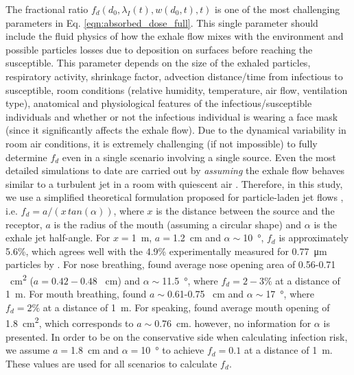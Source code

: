\documentclass[preprint]{elsarticle}
\begin{document}
The fractional ratio $f_d\left(d_0, \lambda_{I}(t), w(d_0, t), t\right)$ is one of the most challenging parameters in Eq. \ref{eqn:absorbed_dose_full}. This single parameter should include the fluid physics of how the exhale flow mixes with the environment and possible particles losses due to deposition on surfaces before reaching the susceptible. This parameter depends on the size of the exhaled particles, respiratory activity, shrinkage factor, advection distance/time from infectious to susceptible, room conditions (relative humidity, temperature, air flow, ventilation type), anatomical and physiological features of the infectious/susceptible individuals and whether or not the infectious individual is wearing a face mask (since it significantly affects the exhale flow). Due to the dynamical variability in room air conditions, it is extremely challenging (if not impossible) to fully determine $f_d$ even in a single scenario involving a single source. Even the most detailed simulations to date are carried out by \emph{assuming} the exhale flow behaves similar to a turbulent jet in a room with quiescent air \cite[e.g. see][and reference therein]{Chong_2021, Wang2021}. Therefore, in this study, we use a simplified theoretical formulation proposed for particle-laden jet flows \cite{Yang2020}, i.e. $f_d = a/(x\, tan(\alpha))$,  where $x$ is the distance between the source and the receptor, $a$ is the radius of the mouth (assuming a circular shape) and $\alpha$ is the exhale jet half-angle. For $x=$\SI{1}{\meter}, $a=$\SI{1.2}{\centi\meter} and $\alpha\sim$\SI{10}{\degree}, $f_d$ is approximately 5.6\%, which agrees well with the 4.9\% experimentally measured for \SI{0.77}{\micro\meter} particles by \cite{Liu2014}. For nose breathing, \citep{Gupta_2010} found average nose opening area of 0.56-0.71 \SI{}{\square\centi\meter} ($a=0.42-0.48$ \SI{}{\centi\meter}) and $\alpha\sim$\SI{11.5}{\degree}, where $f_d=2-3\% $ at a distance of \SI{1}{\meter}. For mouth breathing, \citep{Gupta_2010} found $a\sim$0.61-0.75 \SI{}{\centi\meter} and $\alpha\sim$\SI{17}{\degree}, where $f_d=2\%$ at a distance of \SI{1}{\meter}. For speaking, \citep{Gupta_2010} found average mouth opening of \SI{1.8}{\square\centi\meter}, which corresponds to $a\sim$\SI{0.76}{\centi\meter}. however, no information for $\alpha$ is presented. In order to be on the conservative side when calculating infection risk, we assume $a=$\SI{1.8}{\centi\meter} and $\alpha=$\SI{10}{\degree} to achieve $f_d=0.1$ at a distance of \SI{1}{\meter}. These values are used for all scenarios to calculate $f_d$.
\end{document}
